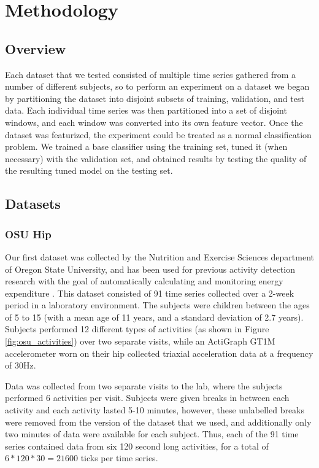 
\chapter{Methodology}
\section{Overview}
Each dataset that we tested consisted of multiple time series gathered from
a number of different subjects, so to perform an experiment on a dataset we began by
partitioning the dataset into disjoint subsets of training, validation,
and test data. Each individual time series was then partitioned into
a set of disjoint windows, and each window was converted into its own feature vector. Once the dataset was
featurized, the experiment could be treated as a normal classification problem.
We trained a base classifier using the training set, tuned it (when necessary)
with the validation set, and obtained results by testing the quality of the
resulting tuned model on the testing set.


\section{Datasets}
\subsection{OSU Hip}
Our first dataset was collected by the Nutrition and Exercise Sciences department of
Oregon State University, and has been used for previous activity detection research
with the goal of automatically calculating and monitoring energy expenditure
\cite{trost12} \cite{zheng12}.
This dataset consisted of 91 time series collected over a 2-week period in a
laboratory environment. The subjects were children between the ages of 5 to 15
(with a mean age of 11 years, and a standard deviation of 2.7 years).
Subjects performed 12 different types of activities (as shown in Figure \ref{fig:osu_activities})
over two separate visits, while an ActiGraph GT1M accelerometer worn on their hip 
collected triaxial acceleration data at a frequency of 30Hz.

Data was collected from two separate visits to the lab, where the subjects performed 6 activities per visit.
Subjects were given breaks in between each activity and each activity lasted 5-10
minutes, however, these unlabelled breaks were removed from the version of the dataset that we
used, and additionally only two minutes of data were available for each subject. Thus, each of
the 91 time series contained data from six 120 second long activities, for a total of
$6*120*30 = 21600$ ticks per time series.

